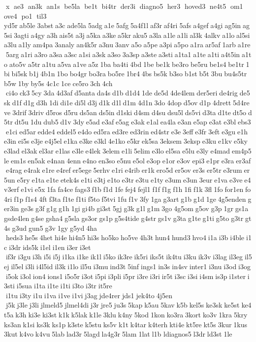 x  ae3  an3k  an1s  be5la  be1t  bi4tr  der3i  diagno5  her3  hoved3  ne4t5  om1  ove4  po1  til3  yd5r ab5le 3abst a3c ade5la 5adg a1e 5afg 5a4f1l af3r af4ri 5afs a4gef a4gi ag5in ag5si 3agti a4gy a3h ais5t a3j a5ka a3ke a5kr aku5 a3la a1le a1li al3k 4alkv a1lo al5si a3lu a1ly am4pa 3analy an4k5r a3nu 3anv a5o a5pe a3pi a5po a1ra ar5af 1arb a1re 5arg a1ri a3ro a3sa a3sc a1si a3sk a3so 3a3sp a3ste a3sti a1ta1 a1te a1ti a4t5in a1to ato5v a5tr a1tu a5va a1ve a5z 1ba ba4ti 4bd 1be be1k be3ro be5ru be1s4 be1tr 1bi bi5sk b1j 4b1n 1bo bo4gr bo3ra bo5re 1br4 4bs bs5k b3so b1st b5t 3bu bu4s5tr b5w 1by by5s 4c1c 1ce ce5ro 3ch 4ch  ci4o ck3 5cy 3da 4d3af d5anta da4s d1b d1d4 1de de5d 4de4lem der5eri de4rig de5sk d1f d1g d3h 1di di1e di5l d3j d1k d1l d1m 4d1n 3do 4dop d5ov d1p 4drett 5d4reve 3drif 3driv d5ros d5ru ds5an ds5in d1ski d4sm d4su dsu5l ds5vi d3ta d1te dt5o d5tr dt5u 1du dub5 d1v 3dy e5ad e3af e5ag e3ak e1al ea4la e3an e5ap e3at e3bl ebs3 e1ci ed5ar edde4 eddel5 e4do ed5ra ed3re ed3rin ed4str e3e 3eff e3fr 3eft e3gu e1h e3in ei5s e3je e4j5el e1ka e3ke e3kl 4e1ko e5kr ek5sa 3eksem 3eksp e3ku e1kv e5ky e3lad el3ak el3ar e1las e3le e4lek 3elem e1li 5elim e3lo el5sa e5lu e3ly e4mad em4p5le em1s en5ak e4nan 4enn e4no en3so e5nu e5ol e3op e1or e3ov epi3 e1pr e3ra er3af e4rag e4rak e1re e4ref er5ege 5erhv e1ri e4rib er1k ero5d er5ov er3s er5tr e3rum er5un e5ry e1ta e1te etek4s e1ti e3tj e1to e3tr e3tu e1ty e3um e3un 3eur e1va e3ve e4v3erf e1vi e5x 1fa fa4ce fags3 f1b f1d 1fe fej4 fejl1 f1f f1g f1h 1fi f1k 3fl 1fo for1en fo4ri f1p f1s4 4ft f3ta f1te f1ti f5to f5tvi 1fu f1v 3fy 1ga g3art g1b g1d 1ge 4g5enden ger3in ge3s g3f g1g g1h 1gi gi4b gi3st 5gj g3k g1l g1m 3go 4g5om g5ov g3p 1gr gs1a gsde4len g4se gsha4 g5sla gs3or gs1p g5s4tide g4str gs1v g3ta g1te g1ti g5to g3tr gt4s g3ud gun5 g3v 1gy g5yd 4ha  heds3 he5s 4het hi4e hi4n5 hi3s ho5ko ho5ve 4h3t hun4 hund3 hvo4 i1a i3b i4ble i1c i3dr ids5k i1el i1en i3er i3et  if3r i3gu i3h i5i i5j i1ka i1ke ik1l i5ko ik3re ik5ri iks5t ik4tu i3ku ik3v i3lag il3eg il5ej il5el i3li i4l5id il3k i1lo il5u i3mu ind3t 5inf ings1 in3s in4sv inter1 i3nu i3od i3og i5ok i3ol ion4 ions1 i5o5r i3ot i5pi i3pli i5pr i3re i3ri ir5t i3sc i3si i4sm is3p i1ster i3sti i5sua i1ta i1te i1ti i3to i3tr it5re  i1tu i3ty i1u i1va i1ve i1vi j3ag jde4rer jds1 jek4to 4j5en  j5k j3le j3li jlmeld5 jlmel4di j3r jre5 ju3s 5kap k5au 5kav k5b kel5s ke3sk ke5st ke4t5a k3h ki3e ki3st k1k k5lak k1le 3klu k4ny 5kod 1kon ko3ra 3kort ko3v 1kra 5kry ks3an k1si ks3k ks1p k3ste k5stu ks5v k1t k4tar k4terh kti4e kt5re kt5s 3kur 1kus 3kut k4vo k4vu 5lab lad3r 5lagd la4g3r 5lam 1lat l1b 	ldiagnos5 l3dr ld3st 1le 